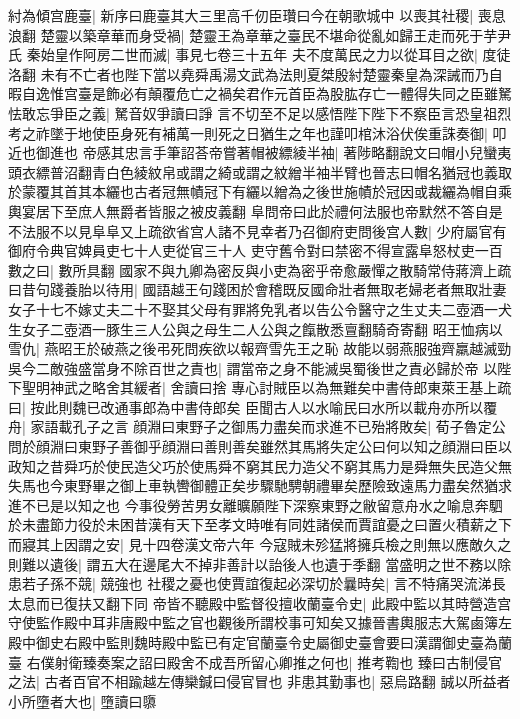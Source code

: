 紂為傾宫鹿臺|{
	新序曰鹿臺其大三里高千仞臣瓚曰今在朝歌城中}
以喪其社稷|{
	喪息浪翻}
楚靈以築章華而身受禍|{
	楚靈王為章華之臺民不堪命從亂如歸王走而死于芋尹氏}
秦始皇作阿房二世而滅|{
	事見七卷三十五年}
夫不度萬民之力以從耳目之欲|{
	度徒洛翻}
未有不亡者也陛下當以堯舜禹湯文武為法則夏桀殷紂楚靈秦皇為深誡而乃自暇自逸惟宫臺是飾必有顛覆危亡之禍矣君作元首臣為股肱存亡一體得失同之臣雖駑怯敢忘爭臣之義|{
	駑音奴爭讀曰諍}
言不切至不足以感悟陛下陛下不察臣言恐皇祖烈考之祚墜于地使臣身死有補萬一則死之日猶生之年也謹叩棺沐浴伏俟重誅奏御|{
	叩近也御進也}
帝感其忠言手筆詔荅帝嘗著帽被縹綾半袖|{
	著陟略翻說文曰帽小兒蠻夷頭衣縹普沼翻青白色綾紋帛或謂之綺或謂之紋繒半袖半臂也晉志曰帽名猶冠也義取於蒙覆其首其本纚也古者冠無幘冠下有纚以繒為之後世施幘於冠因或裁纚為帽自乘輿宴居下至庶人無爵者皆服之被皮義翻}
阜問帝曰此於禮何法服也帝默然不答自是不法服不以見阜阜又上疏欲省宫人諸不見幸者乃召御府吏問後宫人數|{
	少府屬官有御府令典官婢員吏七十人吏從官三十人}
吏守舊令對曰禁密不得宣露阜怒杖吏一百數之曰|{
	數所具翻}
國家不與九卿為密反與小吏為密乎帝愈嚴憚之散騎常侍蔣濟上疏曰昔句踐養胎以待用|{
	國語越王句踐困於會稽既反國命壯者無取老婦老者無取壯妻女子十七不嫁丈夫二十不娶其父母有罪將免乳者以告公令醫守之生丈夫二壺酒一犬生女子二壺酒一豚生三人公與之母生二人公與之餼散悉亶翻騎奇寄翻}
昭王恤病以雪仇|{
	燕昭王於破燕之後弔死問疾欲以報齊雪先王之恥}
故能以弱燕服強齊羸越滅勁吳今二敵強盛當身不除百世之責也|{
	謂當帝之身不能滅吳蜀後世之責必歸於帝}
以陛下聖明神武之略舍其緩者|{
	舍讀曰捨}
專心討賊臣以為無難矣中書侍郎東萊王基上疏曰|{
	按此則魏已改通事郎為中書侍郎矣}
臣聞古人以水喻民曰水所以載舟亦所以覆舟|{
	家語載孔子之言}
顔淵曰東野子之御馬力盡矣而求進不已殆將敗矣|{
	荀子魯定公問於顔淵曰東野子善御乎顔淵曰善則善矣雖然其馬將失定公曰何以知之顔淵曰臣以政知之昔舜巧於使民造父巧於使馬舜不窮其民力造父不窮其馬力是舜無失民造父無失馬也今東野畢之御上車執轡御體正矣步驟馳騁朝禮畢矣歷險致遠馬力盡矣然猶求進不已是以知之也}
今事役勞苦男女離曠願陛下深察東野之敝留意舟水之喻息奔駟於未盡節力役於未困昔漢有天下至孝文時唯有同姓諸侯而賈誼憂之曰置火積薪之下而寢其上因謂之安|{
	見十四卷漢文帝六年}
今寇賊未殄猛將擁兵檢之則無以應敵久之則難以遺後|{
	謂五大在邊尾大不掉非善計以詒後人也遺于季翻}
當盛明之世不務以除患若子孫不競|{
	競強也}
社稷之憂也使賈誼復起必深切於曩時矣|{
	言不特痛哭流涕長太息而已復扶又翻下同}
帝皆不聽殿中監督役擅收蘭臺令史|{
	此殿中監以其時營造宫守使監作殿中耳非唐殿中監之官也觀後所謂校事可知矣又據晉書輿服志大駕鹵簿左殿中御史右殿中監則魏時殿中監已有定官蘭臺令史屬御史臺會要曰漢謂御史臺為蘭臺}
右僕射衛臻奏案之詔曰殿舍不成吾所留心卿推之何也|{
	推考鞫也}
臻曰古制侵官之法|{
	古者百官不相踰越左傳欒鍼曰侵官冒也}
非患其勤事也|{
	惡烏路翻}
誠以所益者小所墮者大也|{
	墮讀曰隳}
